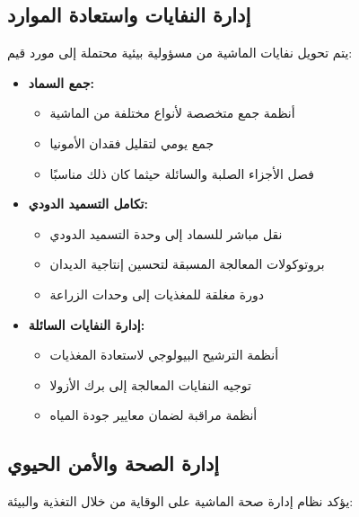 \subsection{إدارة النفايات واستعادة الموارد}

يتم تحويل نفايات الماشية من مسؤولية بيئية محتملة إلى مورد قيم:

\begin{itemize}
    \item \textbf{جمع السماد:}
    \begin{itemize}
        \item أنظمة جمع متخصصة لأنواع مختلفة من الماشية
        \item جمع يومي لتقليل فقدان الأمونيا
        \item فصل الأجزاء الصلبة والسائلة حيثما كان ذلك مناسبًا
    \end{itemize}
    
    \item \textbf{تكامل التسميد الدودي:}
    \begin{itemize}
        \item نقل مباشر للسماد إلى وحدة التسميد الدودي
        \item بروتوكولات المعالجة المسبقة لتحسين إنتاجية الديدان
        \item دورة مغلقة للمغذيات إلى وحدات الزراعة
    \end{itemize}
    
    \item \textbf{إدارة النفايات السائلة:}
    \begin{itemize}
        \item أنظمة الترشيح البيولوجي لاستعادة المغذيات
        \item توجيه النفايات المعالجة إلى برك الأزولا
        \item أنظمة مراقبة لضمان معايير جودة المياه
    \end{itemize}
\end{itemize}

\subsection{إدارة الصحة والأمن الحيوي}

يؤكد نظام إدارة صحة الماشية على الوقاية من خلال التغذية والبيئة:

